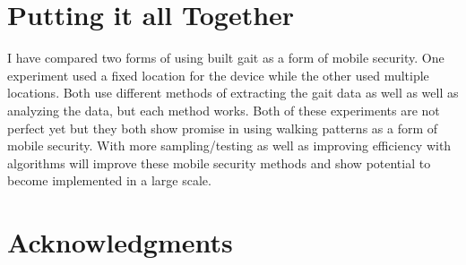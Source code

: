 \documentclass{sig-alternate}
\begin{document}


\section{Putting it all Together}
I have compared two forms of using built gait as a form of mobile security. One experiment used a fixed location for the device while the other used multiple locations. Both use different methods of extracting the gait data as well as well as analyzing the data, but each method works. Both of these experiments are not perfect yet but they both show promise in using walking patterns as a form of mobile security. With more sampling/testing as well as improving efficiency with algorithms will improve these mobile security methods and show potential to become implemented in a large scale. 

\section{Acknowledgments}

  

\end{document}
